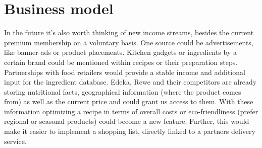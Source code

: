 \section{Business model}
In the future it’s also worth thinking of new income streams, besides the current premium membership on a voluntary basis. One source could be advertisements, like banner ads or product placements. Kitchen gadgets or ingredients by a certain brand could be mentioned within recipes or their preparation steps. 
Partnerships with food retailers would provide a stable income and additional input for the ingredient database. Edeka, Rewe and their competitors are already storing nutritional facts, geographical information (where the product comes from) as well as the current price and could grant us access to them. With these information optimizing a recipe in terms of overall costs or eco-friendliness (prefer regional or seasonal products) could become a new feature. 
Further, this would make it easier to implement a shopping list, directly linked to a partners delivery service.